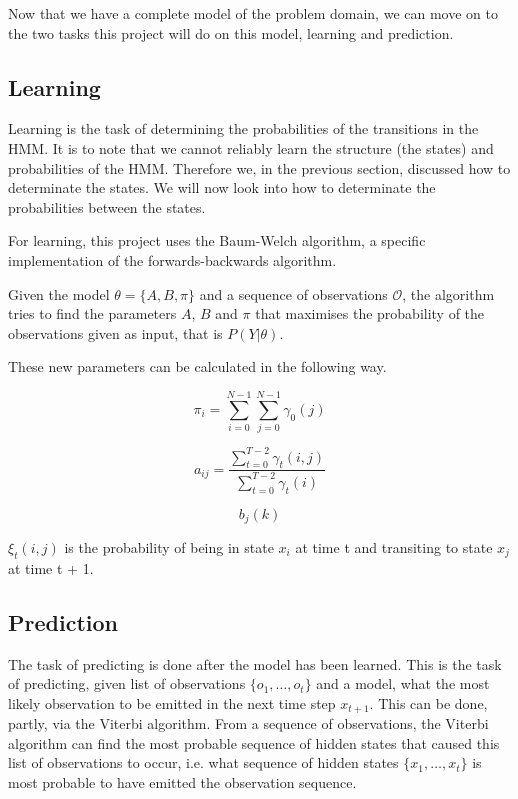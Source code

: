 Now that we have a complete model of the problem domain, we can move on to the two tasks this project will do on this model, learning and prediction.

\subsection{Learning}
Learning is the task of determining the probabilities of the transitions in the HMM. It is to note that we cannot reliably learn the structure (the states) and probabilities of the HMM. Therefore we, in the previous section, discussed how to determinate the states. We will now look into how to determinate the probabilities between the states.

For learning, this project uses the Baum-Welch algorithm, a specific implementation of the forwards-backwards algorithm. 

Given the model $\theta = \{A, B, \pi\}$ and a sequence of observations $\mathcal{O}$, the algorithm tries to find the parameters $A$, $B$ and $\pi$ that maximises the probability of the observations given as input, that is $P(Y | \theta)$.

These new parameters can be calculated in the following way\cite{hmmIntroduction}.

\begin{equation*}
\pi_i = \sum\limits_{i=0}^{N-1} \sum\limits_{j=0}^{N-1} \gamma_0(j)
\end{equation*}

\begin{equation*}
a_{ij} = \frac{\sum\limits_{t=0}^{T-2} \gamma_t(i, j)}{ \sum\limits_{t=0}^{T-2} \gamma_t(i) }
\end{equation*}

\begin{equation*}
b_j(k)
\end{equation*}

$\xi_t (i, j)$ is the probability of being in state $x_i$ at time t and transiting to state $x_j$ at
time t + 1.



\subsection{Prediction}\label{sub:Prediction}
The task of predicting is done after the model has been learned. This is the task of predicting, given list of observations $\{o_1,\dots,o_t\}$ and a model, what the most likely observation to be emitted in the next time step $x_{t+1}$. This can be done, partly, via the Viterbi algorithm. From a sequence of observations, the Viterbi algorithm can find the most probable sequence of hidden states that caused this list of observations to occur, i.e. what sequence of hidden states $\{x_1,\dots,x_t\}$ is most probable to have emitted the observation sequence. 

